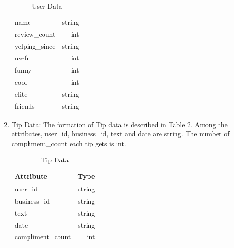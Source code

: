 \documentclass{stylefiles/capstone}
\begin{document}
\begin{enumerate}
\begin{table}[h!]
\begin{tabular}{l r }
        name & string\\
        review\_count & int\\
        yelping\_since & string\\
        useful  &  int\\
        funny   &  int\\
        cool & int\\
        elite & string\\
        friends & string\\
         [1ex] 
         \hline
        \end{tabular}
        \caption{User Data}
    \label{UserData}
    \end{table}
    \item Tip Data: The formation of Tip data is described in Table \ref{TipData}. Among the attributes, user\_id, business\_id, text and date are string. The number of compliment\_count each tip gets is int.
    \begin{table}[h!]
        \centering
        \begin{tabular}{l r } 
         \hline
         Attribute &  Type \\ [0.5ex] 
         \hline
        user\_id & string\\
        business\_id & string\\
        text & string\\
        date & string\\
        compliment\_count & int\\
         [1ex] 
         \hline
        \end{tabular}
        \caption{Tip Data}
    \label{TipData}
    \end{table}
    

\end{enumerate}
\end{document}
